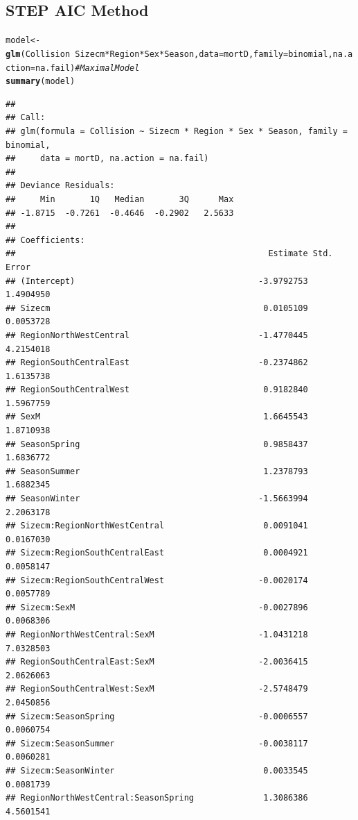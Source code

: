\documentclass{article}\usepackage[]{graphicx}\usepackage[]{color}
\makeatletter
\newcommand{\hlcom}[1]{\textcolor[rgb]{0.678,0.584,0.686}{\textit{#1}}}%
\newcommand{\hlopt}[1]{\textcolor[rgb]{0,0,0}{#1}}%
\newcommand{\hlstd}[1]{\textcolor[rgb]{0.345,0.345,0.345}{#1}}%
\newcommand{\hlkwb}[1]{\textcolor[rgb]{0.69,0.353,0.396}{#1}}%
\newcommand{\hlkwc}[1]{\textcolor[rgb]{0.333,0.667,0.333}{#1}}%
\newcommand{\hlkwd}[1]{\textcolor[rgb]{0.737,0.353,0.396}{\textbf{#1}}}%
\newenvironment{kframe}{%
 \def\at@end@of@kframe{}%
 \ifinner\ifhmode%
  \def\at@end@of@kframe{\end{minipage}}%
  \begin{minipage}{\columnwidth}%
 \fi\fi%
 \def\FrameCommand##1{\hskip\@totalleftmargin \hskip-\fboxsep
 \colorbox{shadecolor}{##1}\hskip-\fboxsep
     \hskip-\linewidth \hskip-\@totalleftmargin \hskip\columnwidth}%
 \MakeFramed {\advance\hsize-\width
   \@totalleftmargin\z@ \linewidth\hsize
   \@setminipage}}%
 {\par\unskip\endMakeFramed%
 \at@end@of@kframe}
\newenvironment{knitrout}{}{} %
\makeatother
\begin{document}
\subsection*{STEP AIC Method}
\begin{knitrout}
\color{fgcolor}\begin{kframe}
\begin{alltt}
\hlstd{model} \hlkwb{<-} \hlkwd{glm}\hlstd{(Collision} \hlopt{~} \hlstd{Sizecm}\hlopt{*}\hlstd{Region}\hlopt{*}\hlstd{Sex}\hlopt{*}\hlstd{Season,} \hlkwc{data} \hlstd{= mortD,} \hlkwc{family} \hlstd{= binomial,} \hlkwc{na.action} \hlstd{= na.fail)} \hlcom{# Maximal Model}
\hlkwd{summary}\hlstd{(model)}
\end{alltt}
\begin{verbatim}
## 
## Call:
## glm(formula = Collision ~ Sizecm * Region * Sex * Season, family = binomial, 
##     data = mortD, na.action = na.fail)
## 
## Deviance Residuals: 
##     Min       1Q   Median       3Q      Max  
## -1.8715  -0.7261  -0.4646  -0.2902   2.5633  
## 
## Coefficients:
##                                                   Estimate Std. Error
## (Intercept)                                     -3.9792753  1.4904950
## Sizecm                                           0.0105109  0.0053728
## RegionNorthWestCentral                          -1.4770445  4.2154018
## RegionSouthCentralEast                          -0.2374862  1.6135738
## RegionSouthCentralWest                           0.9182840  1.5967759
## SexM                                             1.6645543  1.8710938
## SeasonSpring                                     0.9858437  1.6836772
## SeasonSummer                                     1.2378793  1.6882345
## SeasonWinter                                    -1.5663994  2.2063178
## Sizecm:RegionNorthWestCentral                    0.0091041  0.0167030
## Sizecm:RegionSouthCentralEast                    0.0004921  0.0058147
## Sizecm:RegionSouthCentralWest                   -0.0020174  0.0057789
## Sizecm:SexM                                     -0.0027896  0.0068306
## RegionNorthWestCentral:SexM                     -1.0431218  7.0328503
## RegionSouthCentralEast:SexM                     -2.0036415  2.0626063
## RegionSouthCentralWest:SexM                     -2.5748479  2.0450856
## Sizecm:SeasonSpring                             -0.0006557  0.0060754
## Sizecm:SeasonSummer                             -0.0038117  0.0060281
## Sizecm:SeasonWinter                              0.0033545  0.0081739
## RegionNorthWestCentral:SeasonSpring              1.3086386  4.5601541

\end{verbatim}
\end{kframe}
\end{knitrout}
\end{document}
